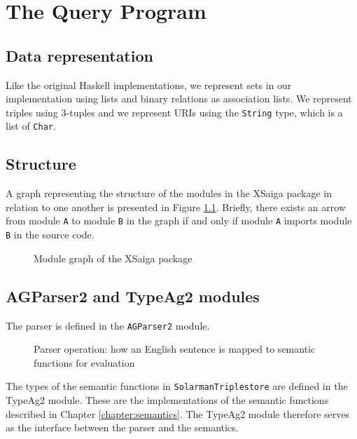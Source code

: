 \documentclass[../main.tex]{subfiles}
\begin{document}
\chapter{The Query Program}

\label{chapter:implementation}

\section{Data representation}

Like the original Haskell implementations, we represent sets in our implementation using lists and binary relations as association lists.  We represent triples using 3-tuples and we represent URIs using the \texttt{String} type, which is a list of \texttt{Char}.

\section{Structure}

A graph representing the structure of the modules in the XSaiga package in relation to one another is presented in Figure \ref{fig:modulegraph}.  Briefly, there exists an arrow from module \texttt{A} to module \texttt{B} in the graph if and only if module \texttt{A} imports module \texttt{B} in the source code.

\begin{figure}[h]
	\centering
	\caption{Module graph of the XSaiga package}
	\label{fig:modulegraph}
\end{figure}


\section{AGParser2 and TypeAg2 modules}
\label{section:nonrefparserimpl}

The parser is defined in the \texttt{AGParser2} module.

\begin{figure}[h]
	\centering
	\caption{Parser operation: how an English sentence is mapped to semantic functions for evaluation\cite{graphmqslide}}
\end{figure}

The types of the semantic functions in \texttt{SolarmanTriplestore} are defined in the TypeAg2 module.
These are the implementations of the semantic functions described in Chapter \ref{chapter:semantics}.
The TypeAg2 module therefore serves as the interface between the parser and the semantics.
\end{document}
